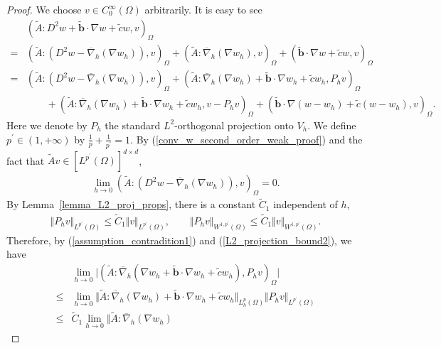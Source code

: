 \documentclass[12pt]{amsart}
\theoremstyle{definition}
\theoremstyle{remark}
\begin{document}
\begin{proof}
We choose $v \in C_{0}^{\infty}(\Omega)$ arbitrarily.
It is easy to see 
\begin{align*}
& (\tilde{A}:D^{2}w + \tilde{\boldsymbol{b}}\cdot \nabla w + \tilde{c} 
w, v)_{\Omega} \\ 
= & (\tilde{A}:(D^{2}w -\overline{\nabla}_{h}(\nabla w_{h})), v )_{\Omega} 
+ (\tilde{A}:\overline{\nabla}_{h}(\nabla w_{h}), v )_{\Omega} 
+ (\tilde{\boldsymbol{b}}\cdot \nabla w + \tilde{c} w, v)_{\Omega} \\
= & (\tilde{A}:(D^{2}w -\overline{\nabla}_{h}(\nabla w_{h})), v )_{\Omega} 
+ (\tilde{A}:\overline{\nabla}_{h}(\nabla w_{h}) 
+ \tilde{\boldsymbol{b}}\cdot \nabla w_{h} + \tilde{c} w_{h}, P_{h} v )_{\Omega} \\
& \qquad + (\tilde{A}:\overline{\nabla}_{h}(\nabla w_{h})
+ \tilde{\boldsymbol{b}}\cdot \nabla w_{h} + \tilde{c} w_{h}, v - P_{h}v )_{\Omega} 
+ (\tilde{\boldsymbol{b}}\cdot \nabla (w-w_{h}) + \tilde{c}(w-w_{h}), v)_{\Omega}.
\end{align*}
Here we denote by $P_{h}$ the standard $L^{2}$-orthogonal projection onto $V_{h}$.
We define $p^{\prime} \in (1, + \infty)$ by  $\frac{1}{p} + \frac{1}{p^{\prime}} = 1$. 
By (\ref{conv_w_second_order_weak_proof}) and the fact that $\tilde{A}v\in [L^{p^{\prime}}(\Omega)]^{d \times d}$, 
\begin{align*}
\lim_{h \rightarrow 0} (\tilde{A}:(D^{2}w -\overline{\nabla}_{h}(\nabla w_{h})), v )_{\Omega} = 0.
\end{align*}
By Lemma~\ref{lemma_L2_proj_props}, there is a constant $\tilde{C}_{1}$ independent of $h$, 
\begin{align}
\label{L2_projection_bound2}
\Vert P_{h} v\Vert_{L^{p^{\prime}}(\Omega)} \leq \tilde{C}_{1} \Vert v\Vert_{L^{p^{\prime}}(\Omega)}, 
\qquad \Vert P_{h} v\Vert_{W^{1,p^{\prime}}(\Omega)} \leq \tilde{C}_{1} \Vert v\Vert_{W^{1,p^{\prime}}(\Omega)}.
\end{align}
Therefore, by (\ref{assumption_contradition1}) and (\ref{L2_projection_bound2}), we have 
\begin{align*}
& \lim_{h\rightarrow 0} \vert (\tilde{A}:\overline{\nabla}_{h}(\nabla w_{h}
+ \tilde{\boldsymbol{b}}\cdot\nabla w_{h}+\tilde{c}w_{h}), P_{h}v)_{\Omega}\vert\\
\leq & \lim_{h \rightarrow 0} \Vert \tilde{A}: \overline{\nabla}_{h}(\nabla w_{h}) 
+ \tilde{\boldsymbol{b}}\cdot \nabla w_{h} + \tilde{c} w_{h}\Vert_{L_{h}^{p}(\Omega)} 
\Vert P_{h} v\Vert_{L^{p^{\prime}}(\Omega)} \\
\leq & \tilde{C}_{1} \lim_{h \rightarrow 0} \Vert \tilde{A}: \overline{\nabla}_{h}(\nabla w_{h}) 

\end{align*}
\end{proof}
\end{document}
